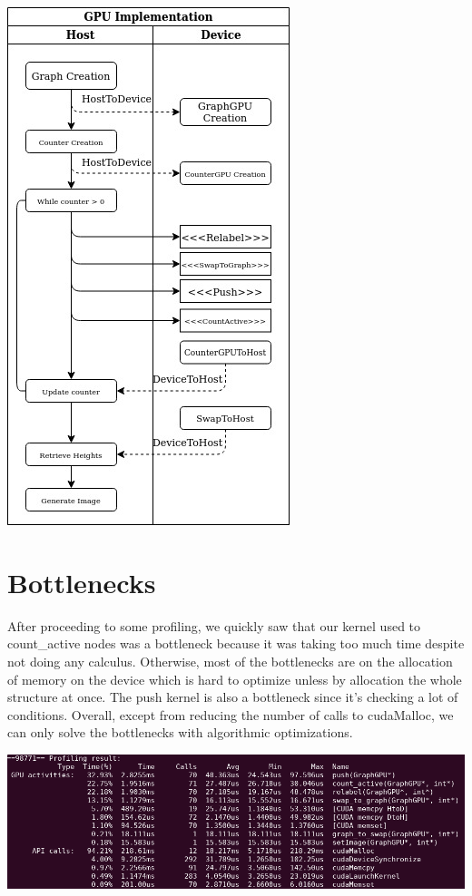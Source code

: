 \documentclass{article}
\begin{document}
\begin{center}
\includegraphics[scale=0.6]{pics/gpu_diagram.jpg}
\end{center}

\section{Bottlenecks}
After proceeding to some profiling, we quickly saw that our kernel used to count\_active nodes was a bottleneck because it was taking too much time despite not doing any calculus. Otherwise,  most of the bottlenecks are on the allocation of memory on the device which is hard to optimize unless by allocation the whole structure at once. The push kernel is also a bottleneck since it's checking a lot of conditions. Overall, except from reducing the number of calls to cudaMalloc, we can only solve the bottlenecks with algorithmic optimizations.

\begin{center}
\includegraphics[scale=0.5]{pics/gpu_prof1_cut.png}
\end{center}
\end{document}
